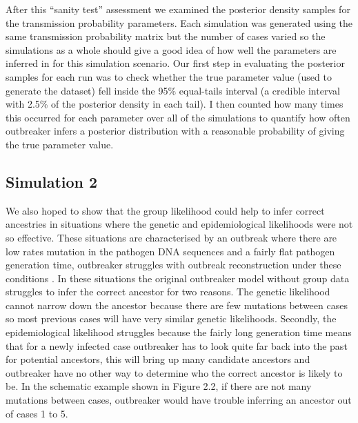 \documentclass[11pt,a4paper]{report}
\begin{document}
After this ``sanity test'' assessment we examined the posterior density samples for the transmission probability parameters. Each simulation was generated using the same transmission probability matrix but the number of cases varied so the simulations as a whole should give a good idea of how well the parameters are inferred in for this simulation scenario. Our first step in evaluating the posterior samples for each run was to check whether the true parameter value (used to generate the dataset) fell inside the 95\% equal-tails interval (a credible interval with 2.5\% of the posterior density in each tail). I then counted how many times this occurred for each parameter over all of the simulations to quantify how often outbreaker infers a posterior distribution with a reasonable probability of giving the true parameter value.
\subsection{Simulation 2}
We also hoped to show that the group likelihood could help to infer correct ancestries in situations where the genetic and epidemiological likelihoods were not so effective. These situations are characterised by an outbreak where there are low rates mutation in the pathogen DNA sequences and a fairly flat pathogen generation time, outbreaker struggles with outbreak reconstruction under these conditions \citep{outbrkr}.  In these situations the original outbreaker model without group data struggles to infer the correct ancestor for two reasons. The genetic likelihood cannot narrow down the ancestor because there are few mutations between cases so most previous cases will have very similar genetic likelihoods. Secondly, the epidemiological likelihood struggles because the fairly long generation time means that for a newly infected case outbreaker has to look quite far back into the past for potential ancestors, this will bring up many candidate ancestors and outbreaker have no other way to determine who the correct ancestor is likely to be. In the schematic example shown in Figure 2.2, if there are not many mutations between cases, outbreaker would have trouble inferring an ancestor out of cases 1 to 5.
\\
\end{document}
